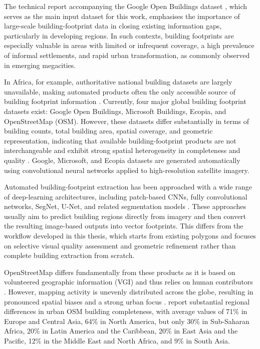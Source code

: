 The technical report accompanying the Google Open Buildings dataset \citep{sirko2021continentalscalebuildingdetectionhigh}, which serves as the main input dataset for this work, emphasises the importance of large-scale building-footprint data in closing existing information gaps, particularly in developing regions. In such contexts, building footprints are especially valuable in areas with limited or infrequent coverage, a high prevalence of informal settlements, and rapid urban transformation, as commonly observed in emerging megacities.

In Africa, for example, authoritative national building datasets are largely unavailable, making automated products often the only accessible source of building footprint information \citep{CHAMBERLAIN2024102104}. Currently, four major global building footprint datasets exist: Google Open Buildings, Microsoft Buildings, Ecopia, and OpenStreetMap (OSM). However, these datasets differ substantially in terms of building counts, total building area, spatial coverage, and geometric representation, indicating that available building-footprint products are not interchangeable and exhibit strong spatial heterogeneity in completeness and quality \citep{CHAMBERLAIN2024102104}. Google, Microsoft, and Ecopia datasets are generated automatically using convolutional neural networks applied to high-resolution satellite imagery.

Automated building-footprint extraction has been approached with a wide range of deep-learning architectures, including patch-based CNNs, fully convolutional networks, SegNet, U-Net, and related segmentation models \citep{Luo_overviewbuioldingfootprint, rastogi2022automatic}. These approaches usually aim to predict building regions directly from imagery and then convert the resulting image-based outputs into vector footprints. This differs from the workflow developed in this thesis, which starts from existing polygons and focuses on selective visual quality assessment and geometric refinement rather than complete building extraction from scratch.

OpenStreetMap differs fundamentally from these products as it is based on volunteered geographic information (VGI) and thus relies on human contributors \citep{CHAMBERLAIN2024102104}. However, mapping activity is unevenly distributed across the globe, resulting in pronounced spatial biases and a strong urban focus \citep{herfort2023spatio}. \citet{herfort2023spatio} report substantial regional differences in urban OSM building completeness, with average values of 71\% in Europe and Central Asia, 64\% in North America, but only 30\% in Sub-Saharan Africa, 20\% in Latin America and the Caribbean, 20\% in East Asia and the Pacific, 12\% in the Middle East and North Africa, and 9\% in South Asia.


